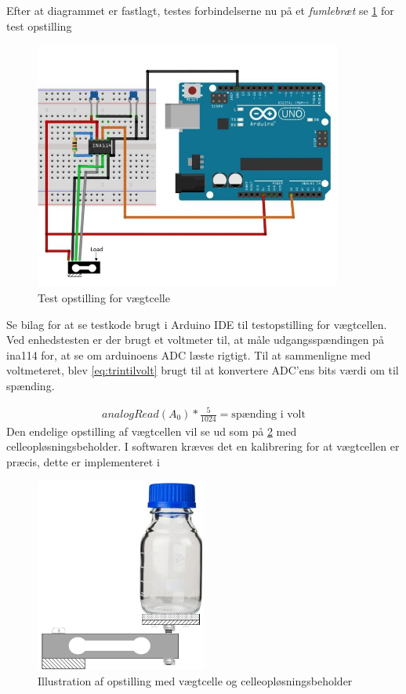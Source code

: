Efter at diagrammet er fastlagt, testes forbindelserne nu på et \textit{fumlebræt} se \ref{fig:loadcelltest} for test opstilling
  \begin{figure}[H]
	\centering
	\includegraphics[width=0.9\textwidth]{billeder/Hardware/diagrammer/Drawing1.jpg}
	\caption{Test opstilling for vægtcelle}
	\label{fig:loadcelltest}
\end{figure}
 Se bilag for at se testkode brugt i Arduino IDE til testopstilling for vægtcellen. Ved enhedstesten er der brugt et voltmeter til, at måle udgangsspændingen på ina114 for, at se om arduinoens ADC læste rigtigt. Til at sammenligne med voltmeteret, blev \ref{eq:trintilvolt} brugt til at konvertere ADC'ens bits værdi om til spænding.
 
 \begin{align}
 analogRead(A_0)*\frac{5}{1024}=\text{spænding i volt}
 \label{eq:trintilvolt}
 \end{align}
Den endelige opstilling af vægtcellen vil se ud som på \ref{fig:loadcell_mont} med celleopløsningsbeholder. I softwaren kræves det en kalibrering for at vægtcellen er præcis, dette er implementeret i 
 
 \begin{figure}[H]
	\centering
	\includegraphics[width=0.5\textwidth]{billeder/Hardware/diagrammer/loadcell_montering.pdf}
	\caption{Illustration af opstilling med vægtcelle og celleopløsningsbeholder}
	\label{fig:loadcell_mont}
\end{figure}
 